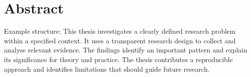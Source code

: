 \chapter*{Abstract}


Example structure: This thesis investigates a clearly defined research problem
within a specified context. It uses a transparent research design to collect and
analyse relevant evidence. The findings identify an important pattern and explain
its significance for theory and practice. The thesis contributes a reproducible
approach and identifies limitations that should guide future research.


